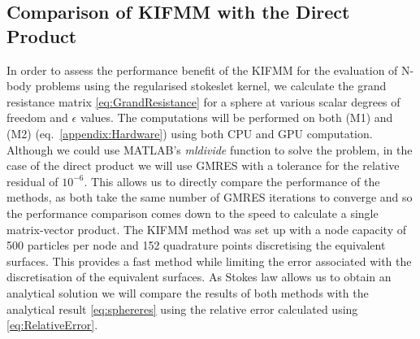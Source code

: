 \subsection{Comparison of KIFMM with the Direct Product}
In order to assess the performance benefit of the KIFMM for the evaluation of N-body problems using the regularised stokeslet kernel, we calculate the grand resistance matrix \cref{eq:GrandResistance} for a sphere at various scalar degrees of freedom and $\epsilon$ values. The computations will be performed on both (M1) and (M2) (eq.~\ref{appendix:Hardware}) using both CPU and GPU computation. Although we could use MATLAB's \textit{mldivide} function to solve the problem, in the case of the direct product we will use GMRES with a tolerance for the relative residual of $10^{-6}$. This allows us to directly compare the performance of the methods, as both take the same number of GMRES iterations to converge and so the performance comparison comes down to the speed to calculate a single matrix-vector product. The KIFMM method was set up with a node capacity of 500 particles per node and 152 quadrature points discretising the equivalent surfaces. This provides a fast method while limiting the error associated with the discretisation of the equivalent surfaces. As Stokes law allows us to obtain an analytical solution we will compare the results of both methods with the analytical result \cref{eq:sphereres} using the relative error calculated using \cref{eq:RelativeError}.

